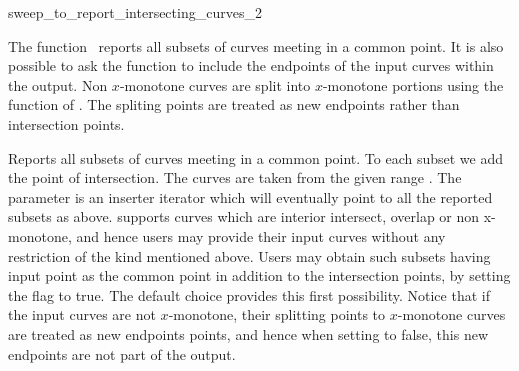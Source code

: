 

\begin{ccRefFunction}{sweep_to_report_intersecting_curves_2}  %


\ccDefinition
  
The function \ccRefName\ reports all subsets of curves meeting in a 
common point.
It is also possible to ask the function to
include the endpoints of the input curves within the output.
Non $x$-monotone curves are split into $x$-monotone 
portions using the  function of
. 
The spliting points are treated as new endpoints rather than 
intersection points.


  {Reports all subsets of curves meeting in a common point.
   To each subset we add the point of intersection.
   The curves are taken from the given range \ccStyle{[curves_begin,curves_end)}. 
   The parameter  is an inserter iterator which 
   will eventually point to all the reported subsets as above. 
    supports
   curves which are interior intersect, overlap or non x-monotone, and
   hence users may provide their input curves without any
   restriction of the kind mentioned above. 
   Users may obtain such subsets having input point as the common point 
   in addition to the intersection points,
   by setting the flag  to true. 
   The default choice provides this first possibility. 
   Notice that if the input curves are not $x$-monotone, their splitting points 
   to $x$-monotone curves are treated as new endpoints points, and hence 
   when setting  to false, this new endpoints are not part 
   of the output.}


\end{ccRefFunction}
